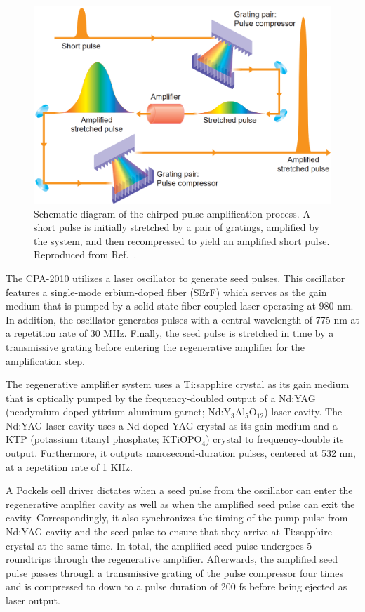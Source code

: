 \begin{figure}[ht]
	\centering
	\includegraphics[scale=0.31]{images/chapter_methods/cpa_process_service}
	\caption{Schematic diagram of the chirped pulse amplification process. A short pulse is initially stretched by a pair of gratings, amplified by the system, and then recompressed to yield an amplified short pulse. Reproduced from Ref.\ \cite{service154}.}
	\label{fig:cpa_process}
\end{figure}

The CPA-2010 utilizes a laser oscillator to generate seed pulses. This oscillator features a single-mode erbium-doped fiber (SErF) which serves as the gain medium that is pumped by a solid-state fiber-coupled laser operating at 980 nm. In addition, the oscillator generates pulses with a central wavelength of 775 nm at a repetition rate of 30 MHz. Finally, the seed pulse is stretched in time by a transmissive grating before entering the regenerative amplifier for the amplification step.

The regenerative amplifier system uses a Ti:sapphire crystal as its gain medium that is optically pumped by the frequency-doubled output of a Nd:YAG (neodymium-doped yttrium aluminum garnet; Nd:Y$_3$Al$_5$O$_{12}$) laser cavity. The Nd:YAG laser cavity uses a Nd-doped YAG crystal as its gain medium and a KTP (potassium titanyl phosphate; KTiOPO$_4$) crystal to frequency-double its output. Furthermore, it outputs nanosecond-duration pulses, centered at 532 nm, at a repetition rate of 1 KHz.

A Pockels cell driver dictates when a seed pulse from the oscillator can enter the regenerative amplfier cavity as well as when the amplified seed pulse can exit the cavity. Correspondingly, it also synchronizes the timing of the pump pulse from Nd:YAG cavity and the seed pulse to ensure that they arrive at Ti:sapphire crystal at the same time. In total, the amplified seed pulse undergoes 5 roundtrips through the regenerative amplifier. Afterwards, the amplified seed pulse passes through a transmissive grating of the pulse compressor four times and is compressed to down to a pulse duration of 200 fs before being ejected as laser output.

